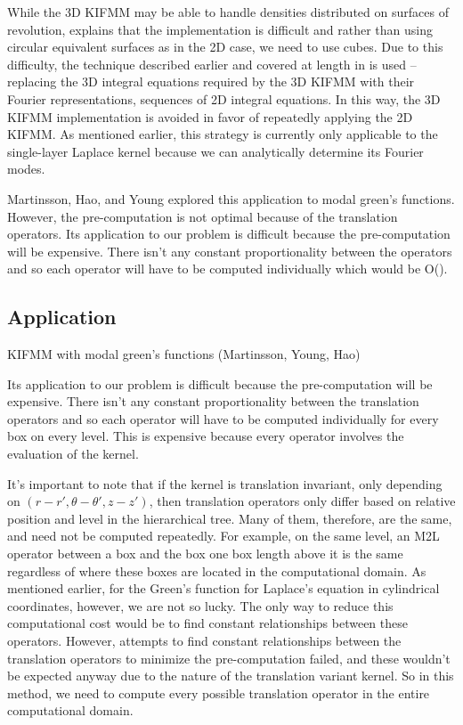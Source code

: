 \documentclass[11pt, oneside]{article}   	%
\begin{document}
While the 3D KIFMM may be able to handle densities distributed on surfaces of revolution, \cite{YBZ} explains that the implementation is difficult and rather than using circular equivalent surfaces as in the 2D case, we need to use cubes. Due to this difficulty, the technique described earlier and covered at length in \cite{YYM} is used -- replacing the 3D integral equations required by the 3D KIFMM with their Fourier representations, sequences of 2D integral equations. In this way, the 3D KIFMM implementation is avoided in favor of repeatedly applying the 2D KIFMM. As mentioned earlier, this strategy is currently only applicable to the single-layer Laplace kernel because we can analytically determine its Fourier modes.

Martinsson, Hao, and Young explored this application to modal green's functions. However, the pre-computation is not optimal because of the translation operators. Its application to our problem is difficult because the pre-computation will be expensive. There isn't any constant proportionality between the operators and so each operator will have to be computed individually which would be O().

\subsection{Application}
KIFMM with modal green's functions (Martinsson, Young, Hao)

Its application to our problem is difficult because the pre-computation will be expensive. There isn't any constant proportionality between the translation operators and so each operator will have to be computed individually for every box on every level. This is expensive because every operator involves the evaluation of the kernel.

It's important to note that if the kernel is translation invariant, only depending on $(r-r',\theta-\theta',z-z')$, then translation operators only differ based on relative position and level in the hierarchical tree. Many of them, therefore, are the same, and need not be computed repeatedly. For example, on the same level, an M2L operator between a box and the box one box length above it is the same regardless of where these boxes are located in the computational domain. As mentioned earlier, for the Green's function for Laplace's equation in cylindrical coordinates, however, we are not so lucky. The only way to reduce this computational cost would be to find constant relationships between these operators. However, attempts to find constant relationships between the translation operators to minimize the pre-computation failed, and these wouldn't be expected anyway due to the nature of the translation variant kernel. So in this method, we need to compute every possible translation operator in the entire computational domain.
\end{document}
